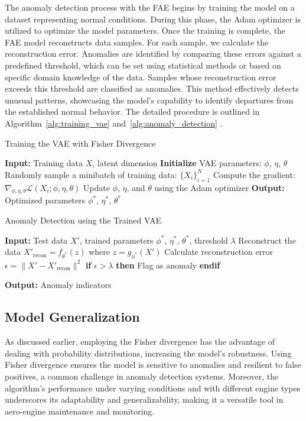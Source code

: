 \documentclass[journal]{IEEEtran}
\begin{document}
The anomaly detection process with the FAE begins by training the model on a dataset representing normal conditions. During this phase, the Adam optimizer is utilized to optimize the model parameters. Once the training is complete, the FAE model reconstructs data samples. For each sample, we calculate the reconstruction error. Anomalies are identified by comparing these errors against a predefined threshold, which can be set using statistical methods or based on specific domain knowledge of the data. Samples whose reconstruction error exceeds this threshold are classified as anomalies. This method effectively detects unusual patterns, showcasing the model's capability to identify departures from the established normal behavior. The detailed procedure is outlined in Algorithm~\ref{alg:training_vae} and~\ref{alg:anomaly_detection} .

\begin{algorithm}
\caption{Training the VAE with Fisher Divergence}
\label{alg:training_vae}
\begin{algorithmic}[1]
\State \textbf{Input:} Training data $X$, latent dimension
\State \textbf{Initialize} VAE parameters: $\phi$, $\eta$, $\theta$
\Repeat
    \State Randomly sample a minibatch of training data: $\{X_i\}_{i=1}^N$
    \State Compute the gradient: $\nabla_{\phi, \eta, \theta} \mathcal{L} (X_i; \phi, \eta, \theta)$
    \State Update $\phi$, $\eta$, and $\theta$ using the Adam optimizer
\State \textbf{Output:} Optimized parameters $\phi^*$, $\eta^*$, $\theta^*$
\end{algorithmic}
\end{algorithm}

\begin{algorithm}
\caption{Anomaly Detection using the Trained VAE}
\label{alg:anomaly_detection}
\begin{algorithmic}[1]
\State \textbf{Input:} Test data $X'$, trained parameters $\phi^*$, $\eta^*$, $\theta^*$, threshold $\lambda$
\State Reconstruct the data $X'_{\text{recon}} = f_{\theta^*}(z)$ where $z = g_{\phi^*}(X')$
\State Calculate reconstruction error $\epsilon = \|X' - X'_{\text{recon}}\|^2$
\State \textbf{if} $\epsilon > \lambda$
    \State \quad \textbf{then} Flag as anomaly
    \State \textbf{endif}

\State \textbf{Output:} Anomaly indicators
\end{algorithmic}
\end{algorithm}


\subsection{Model Generalization}
As discussed earlier, employing the Fisher divergence has the advantage of dealing with probability distributions, increasing the model's robustness. Using Fisher divergence ensures the model is sensitive to anomalies and resilient to false positives, a common challenge in anomaly detection systems. Moreover, the algorithm's performance under varying conditions and with different engine types underscores its adaptability and generalizability, making it a versatile tool in aero-engine maintenance and monitoring.
\end{document}
